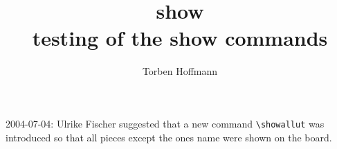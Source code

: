\documentclass[11pt,twocolumn]{article}
\title{show\\testing of the show commands}
\author{Torben Hoffmann }
\begin{document}
\parindent=0pt

\maketitle

2004-07-04: Ulrike Fischer suggested that a new command \verb|\showallut| was
introduced so that all pieces except the ones name were shown on the board.


\newgame
{}

\showboard
\end{document}
